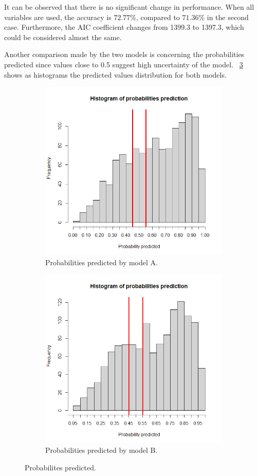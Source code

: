 It can be observed that there is no significant change in performance. When all variables are used, the accuracy is $72.77\%$, compared to $71.36\%$ in the second case. Furthermore, the AIC coefficient changes from 1399.3 to 1397.3, which could be considered almost the same. 

Another comparison made by the two models is concerning the probabilities predicted since values close to 0.5 suggest high uncertainty of the model. \Fig~\ref{fig:ProbPred} shows as histograms the predicted values distribution for both models.

\begin{figure}[h]
	\begin{subfigure}{.6\textwidth}
		\centering
		\includegraphics[width=0.7\linewidth]{ImageFiles/Classification/LogReg/probability_pred_all}
		\caption{Probabilities predicted by model A.}
		\label{fig:ProbPredA}
	\end{subfigure}
	\begin{subfigure}{.6\textwidth}
		\centering
		\includegraphics[width=0.7\linewidth]{ImageFiles/Classification/LogReg/probability_pred_imp}
		\caption{Probabilities predicted by model B.}
		\label{fig:ProbPredB}
	\end{subfigure}
	\caption{Probabilites predicted.}
	\label{fig:ProbPred}
\end{figure}
